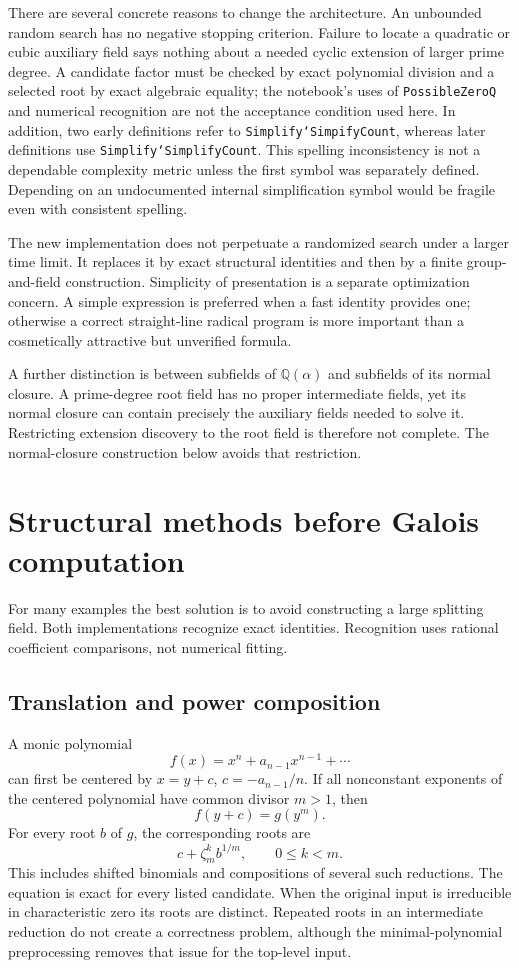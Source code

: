 \documentclass[11pt,a4paper]{article}
\theoremstyle{definition}
\theoremstyle{remark}
\newcommand{\Q}{\mathbb Q}
\newcommand{\code}[1]{\texttt{#1}}
\newcommand{\z}{\zeta}
\begin{document}
There are several concrete reasons to change the architecture. An unbounded
random search has no negative stopping criterion. Failure to locate a
quadratic or cubic auxiliary field says nothing about a needed cyclic
extension of larger prime degree. A candidate factor must be checked by exact
polynomial division and a selected root by exact algebraic equality; the
notebook's uses of \code{PossibleZeroQ} and numerical recognition are not the
acceptance condition used here. In addition, two early definitions refer to
\code{Simplify`SimpifyCount}, whereas later definitions use
\code{Simplify`SimplifyCount}. This spelling inconsistency is not a dependable
complexity metric unless the first symbol was separately defined. Depending on
an undocumented internal simplification symbol would be fragile even with
consistent spelling.

The new implementation does not perpetuate a randomized search under a larger
time limit. It replaces it by exact structural identities and then by a
finite group-and-field construction. Simplicity of presentation is a separate
optimization concern. A simple expression is preferred when a fast identity
provides one; otherwise a correct straight-line radical program is more
important than a cosmetically attractive but unverified formula.

A further distinction is between subfields of $\Q(\alpha)$ and subfields of its
normal closure. A prime-degree root field has no proper intermediate fields,
yet its normal closure can contain precisely the auxiliary fields needed to
solve it. Restricting extension discovery to the root field is therefore not
complete. The normal-closure construction below avoids that restriction.

\section{Structural methods before Galois computation}
\label{sec:fast}
For many examples the best solution is to avoid constructing a large splitting
field. Both implementations recognize exact identities. Recognition uses
rational coefficient comparisons, not numerical fitting.

\subsection{Translation and power composition}
A monic polynomial
\[
 f(x)=x^n+a_{n-1}x^{n-1}+\cdots
\]
can first be centered by $x=y+c$, $c=-a_{n-1}/n$. If all nonconstant exponents
of the centered polynomial have common divisor $m>1$, then
\[
 f(y+c)=g(y^m).
\]
For every root $b$ of $g$, the corresponding roots are
\begin{equation}\label{eq:power-lift}
 c+\z_m^k b^{1/m},\qquad 0\leq k<m.
\end{equation}
This includes shifted binomials and compositions of several such reductions.
The equation is exact for every listed candidate. When the original input is
irreducible in characteristic zero its roots are distinct. Repeated roots in
an intermediate reduction do not create a correctness problem, although the
minimal-polynomial preprocessing removes that issue for the top-level input.
\end{document}
